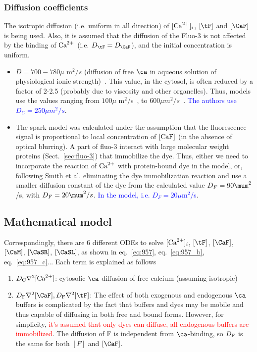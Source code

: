 \subsubsection{Diffusion coefficients}
\label{sec:diff-coeff}

The isotropic diffusion (i.e. uniform in all direction) of  $[{\text{Ca}^{2+}}]_i$, $[\tF]$
and $[\CaF]$ is being used. Also, it is assumed that the diffusion of the Fluo-3 
is not affected by the binding of ${\text{Ca}^{2+}}$ (i.e. $D_\tF=D_\CaF$), and the initial
concentration is uniform.

\begin{itemize}
\item $D = 700-780\mu$ m$^2/s$ (diffusion of free $\ca$ in aqueous
  solution of physiological ionic strength)~\citep{wang1953}. This
  value, in the cytosol, is often reduced by a factor of 2-2.5
  (probably due to viscosity and other organelles). Thus, models use
  the values ranging from $100\mu$ m$^2$/s~\citep{langer1996}, to
  $600\mu m^2/s$~\citep{pratusevich1996}.
  \textcolor{blue}{ The authors use $D_C = 250\mu m^2/s$}.


\item The spark model was calculated under the assumption that the
  fluorescence signal is proportional to local concentration of $[\ce{CaF}]$ (in
  the absence of optical blurring). A part of fluo-3 interact with large
  molecular weight proteins (Sect.~\ref{sec:fluo-3}) that immobilize the dye.
  Thus, either we need to incorporate the reaction of ${\text{Ca}^{2+}}$ with protein-bound
  dye in the model, or, following Smith et al. eliminating the dye
  immobilization reaction and use a smaller diffusion constant of the dye from
  the calculated value $D_F=90\mum^2$/s, with $D_F=20\mum^2/s$. 
  \textcolor{blue}{In the model, i.e. $D_F=20\mu$m$^2$/s}.
 
\end{itemize}

\subsection{Mathematical model}
\label{sec:mathematical-model-14}

Correspondingly, there are 6 different ODEs to solve $[{\text{Ca}^{2+}}]_i$, $[\tF]$,
$[\CaF]$, $[\CaM]$, $[\CaSR]$, $[\CaSL]$, as shown in eq.~\eqref{eq:957},
eq.~\eqref{eq:957_b}, eq.~\eqref{eq:957_c}... Each term is explained as follows

\begin{enumerate}
\item $D_\text{C}\nabla^2 [{\text{Ca}^{2+}}]$: cytosolic $\ca$ diffusion of free
  calcium (assuming isotropic)

\item $D_{\ce{F}}\nabla^2[\CaF], D_\text{F}\nabla^2[\tF]$: The effect of
  both exogenous and endogenous $\ca$ buffers is complicated by the
  fact that buffers and dyes may be mobile and thus capable of
  diffusing in both free and bound forms. However, for simplicity,
  \textcolor{red}{it's assumed that only dyes can diffuse, all
    endogenous buffers are immobilized}.
  The diffusion of F is independent from $\ca$-binding, so $D_{\ce{F}}$
  is the same for both $[F]$ and $[\CaF]$.
\end{enumerate}

